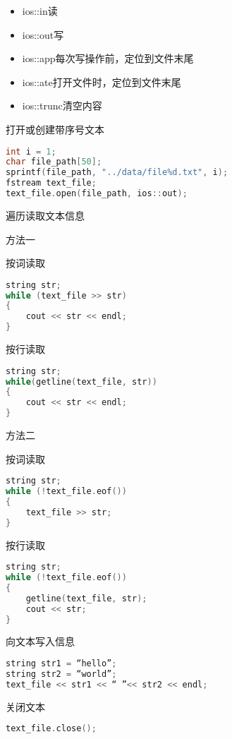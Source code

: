 \documentclass[11pt,a4paper]{article}
\begin{document}
\begin{itemize}
    \item ios::in读
    \item ios::out写
    \item ios::app每次写操作前，定位到文件末尾
    \item ios::ate打开文件时，定位到文件末尾
    \item ios::trunc清空内容
\end{itemize}

打开或创建带序号文本

\begin{lstlisting}[language={C++}]
int i = 1;
char file_path[50];
sprintf(file_path, "../data/file%d.txt", i);
fstream text_file;
text_file.open(file_path, ios::out);
\end{lstlisting}

遍历读取文本信息

方法一

按词读取

\begin{lstlisting}[language={C++}]
string str;
while (text_file >> str)
{
    cout << str << endl;
}
\end{lstlisting}

按行读取

\begin{lstlisting}[language={C++}]
string str;
while(getline(text_file, str))
{
    cout << str << endl;
}
\end{lstlisting}

方法二

按词读取

\begin{lstlisting}[language={C++}]
string str;
while (!text_file.eof())
{
    text_file >> str;
}
\end{lstlisting}

按行读取

\begin{lstlisting}[language={C++}]
string str;
while (!text_file.eof())
{
    getline(text_file, str);
    cout << str;
}
\end{lstlisting}

向文本写入信息

\begin{lstlisting}[language={C++}]
string str1 = “hello”;
string str2 = “world”;
text_file << str1 << “ ”<< str2 << endl;
\end{lstlisting}

关闭文本

\begin{lstlisting}[language={C++}]
text_file.close();
\end{lstlisting}
\end{document}

